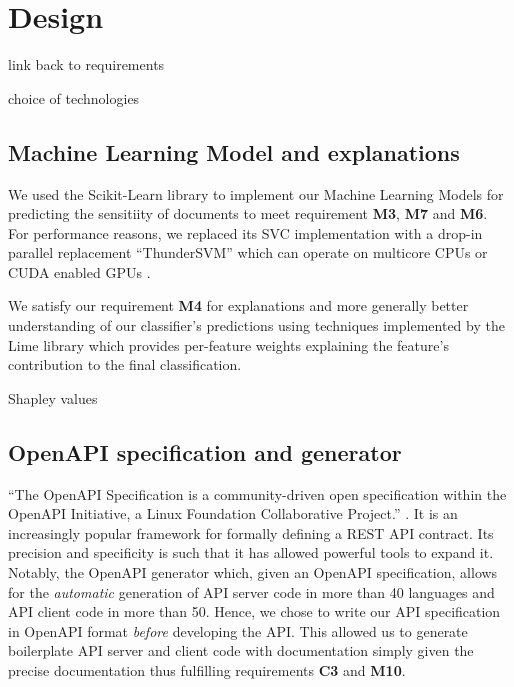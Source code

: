 \documentclass{l4proj}
\begin{document}
\chapter{Design}

link back to requirements

choice of technologies

\section{Machine Learning Model and explanations}


We used the Scikit-Learn library to implement our Machine Learning Models \autocite{pedregosaScikitlearnMachineLearning2011} for predicting the sensitiity of documents to meet requirement \textbf{M3}, \textbf{M7} and \textbf{M6}. For performance reasons, we replaced its SVC implementation with a drop-in parallel replacement ``ThunderSVM'' which can operate on multicore CPUs or CUDA enabled GPUs \autocite{wenThunderSVMFastSVM2018}.

We satisfy our requirement \textbf{M4} for explanations and more generally better understanding of our classifier's predictions using techniques implemented by the Lime library \autocite{ribeiroWhyShouldTrust2016} which provides per-feature weights explaining the feature's contribution to the final classification.

\autocite{lundbergUnifiedApproachInterpreting2017} Shapley values


\section{OpenAPI specification and generator}

``The OpenAPI Specification is a community-driven open specification within the OpenAPI Initiative, a Linux Foundation Collaborative Project.'' \autocite{OAIOpenAPISpecification2020}.
It is an increasingly popular framework for formally defining a REST API contract.
Its precision and specificity is such that it has allowed powerful tools to expand it.
Notably, the OpenAPI generator \autocite{OpenAPIToolsOpenapigenerator2020} which, given an OpenAPI specification, allows for the \textit{automatic} generation of API server code in more than 40 languages and API client code in more than 50.
Hence, we chose to write our API specification in OpenAPI format \textit{before} developing the API.
This allowed us to generate boilerplate API server and client code with documentation simply given the precise documentation thus fulfilling requirements \textbf{C3} and \textbf{M10}.
\end{document}
